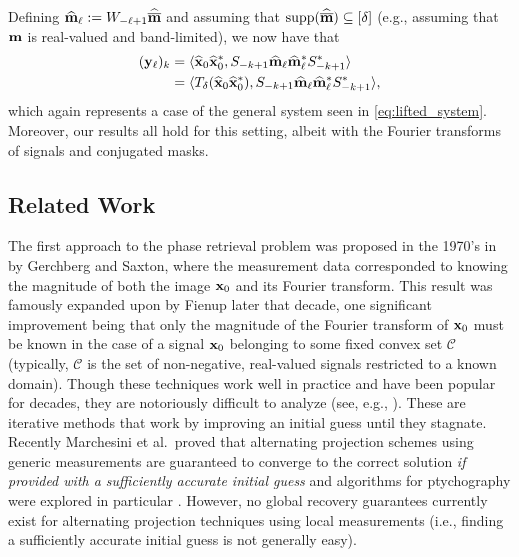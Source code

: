 Defining $\widehat{\mathbf m}_\ell := W_{-\ell+1}\widehat{\overline{\mathbf m}}$ and assuming that $\operatorname{supp}(\widehat{\overline{\mathbf m}})\subseteq [\delta]$ (e.g., assuming that $\mathbf m$ is real-valued and band-limited), we now have that
\begin{align}
    (\mathbf y_\ell)_{k}   &= \langle \widehat{\mathbf x}_0 \widehat{\mathbf x}_0^*, S_{-k+1} \widehat{\mathbf m}_\ell \widehat{\mathbf m}_\ell^* S_{-k+1}^*\rangle \notag\\
   &= \langle T_\delta(\widehat{\mathbf x}_0 \widehat{\mathbf x}_0^*), S_{-k+1} \widehat{\mathbf m}_\ell \widehat{\mathbf m}_\ell^* S_{-k+1}^*\rangle, \notag
\end{align}
which again represents a case of the general system seen in \eqref{eq:lifted_system}. Moreover, our results all hold for this setting, albeit with the Fourier transforms of signals and conjugated masks.

\subsection{Related Work}
\label{sec:lit}

The first approach to the phase retrieval problem was proposed in the 1970's in \cite{gerchberg1972practical} by Gerchberg and Saxton, where the measurement data corresponded to knowing the magnitude of both the image $\mathbf x_0$ and its Fourier transform.  This result was famously expanded upon by Fienup \cite{fienup1978reconstruction} later that decade, one significant improvement being that only the magnitude of the Fourier transform of $\mathbf x_0$ must be known in the case of a signal $\mathbf x_0$ belonging to some fixed convex set $\mathcal{C}$ (typically, $\mathcal{C}$ is the set of non-negative, real-valued signals restricted to a known domain).  Though these techniques work well in practice and have been popular for decades, they are notoriously difficult to analyze (see, e.g., \cite{bauschke2003hybrid,bauschke2002phase,elser2003phase,takajo1997numerical,takajo1999further,takajo1998study}).  These are  iterative methods that work by improving an initial guess until they stagnate.  Recently Marchesini et al.~proved that alternating projection schemes using generic measurements are guaranteed to converge to the correct solution {\em if provided with a sufficiently accurate initial guess} and algorithms for ptychography were explored in particular \cite{marchesini2015alternating}.  However, no global recovery guarantees currently exist for alternating projection techniques using local measurements (i.e., finding a sufficiently accurate initial guess is not generally easy).

